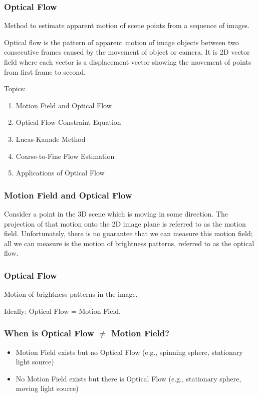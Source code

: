 \begin{frame}
  \frametitle{Optical Flow}
    Method to estimate apparent motion of scene points from a sequence of images.

    Optical flow is the pattern of apparent motion of image objects between two consecutive frames caused by the movement of object or camera. It is 2D vector field where each vector is a displacement vector showing the movement of points from first frame to second.

    Topics:
    \begin{enumerate}
    \item Motion Field and Optical Flow
    \item Optical Flow Constraint Equation
    \item Lucas-Kanade Method
    \item Coarse-to-Fine Flow Estimation
    \item Applications of Optical Flow
    \end{enumerate}
\end{frame}

\begin{frame}
  \frametitle{Motion Field and Optical Flow}
    Consider a point in the 3D scene which is moving in some direction. The projection of that motion onto the 2D image plane is referred to as the motion field. Unfortunately, there is no guarantee that we can measure this motion field; all we can measure is the motion of brightness patterns, referred to as the optical flow.

    \vspace{0.5cm}
    \centering
\end{frame}

\begin{frame}
  \frametitle{Optical Flow}
Motion of brightness patterns in the image.

Ideally: Optical Flow = Motion Field.

\vspace{0.5cm}
\centering
\end{frame}

\begin{frame}
  \frametitle{When is Optical Flow $\neq$ Motion Field?}
\begin{itemize}
  \item Motion Field exists but no Optical Flow (e.g., spinning sphere, stationary light source)
  \item No Motion Field exists but there is Optical Flow (e.g., stationary sphere, moving light source)
\end{itemize}

\vspace{0.5cm}
\centering
\end{frame}

